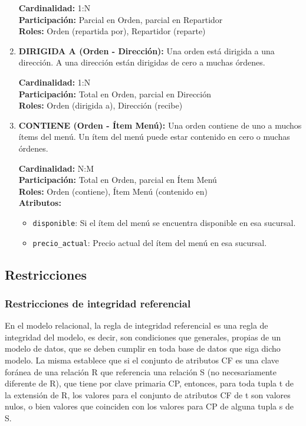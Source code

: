 \begin{enumerate}
    \textbf{Cardinalidad:} 1:N \\
    \textbf{Participación:} Parcial en Orden, parcial en Repartidor \\
    \textbf{Roles:} Orden (repartida por), Repartidor (reparte)

    \item \textbf{DIRIGIDA A (Orden - Dirección):} Una orden está dirigida a una dirección. A una dirección están dirigidas de cero a muchas órdenes.

    \textbf{Cardinalidad:} 1:N \\
    \textbf{Participación:} Total en Orden, parcial en Dirección \\
    \textbf{Roles:} Orden (dirigida a), Dirección (recibe)
    
    \item \textbf{CONTIENE (Orden - Ítem Menú):} Una orden contiene de uno a muchos ítems del menú. Un ítem del menú puede estar contenido en cero o muchas órdenes.

    \textbf{Cardinalidad:} N:M \\
    \textbf{Participación:} Total en Orden, parcial en Ítem Menú \\
    \textbf{Roles:} Orden (contiene), Ítem Menú (contenido en) \\
    \textbf{Atributos:}
    \begin{itemize}
        \item \texttt{disponible}: Si el ítem del menú se encuentra disponible en esa sucursal.
        \item \texttt{precio\_actual}: Precio actual del ítem del menú en esa sucursal.
    \end{itemize}
\end{enumerate}

\subsection{Restricciones}

\subsubsection{Restricciones de integridad referencial}

En el modelo relacional, la regla de integridad referencial es una regla de integridad del modelo, es decir, son condiciones que generales, propias de un modelo de datos, que se deben cumplir en toda base de datos que siga dicho modelo. La misma establece que si el conjunto de atributos CF es una clave foránea de una relación R que referencia una relación S (no necesariamente diferente de R), que tiene por clave primaria CP, entonces, para toda tupla t de la extensión de R, los valores para el conjunto de atributos CF de t son valores nulos, o bien valores que coinciden con los valores para CP de alguna tupla s de S.

